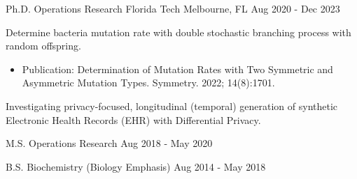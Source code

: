 \vspace{-4mm}
\vspace{-2mm}

\begin{cventries}

	\cventry
	{Ph.D. Operations Research}
	{Florida Tech}
	{Melbourne, FL}
	{Aug 2020 - Dec 2023}
	{\begin{cvitems}
			\item {Determine bacteria mutation rate with double stochastic branching process with random offspring.
			            \begin{itemize}
				            \item {Publication: Determination of Mutation Rates with Two Symmetric and Asymmetric Mutation Types. Symmetry. 2022; 14(8):1701.}
			            \end{itemize}}
			\item {Investigating privacy-focused, longitudinal (temporal) generation of synthetic Electronic Health Records (EHR) with Differential Privacy.}
		\end{cvitems}}

	\vspace{-2mm}

	\cventry
	{M.S. Operations Research}
	{}
	{}
	{Aug 2018 - May 2020}
	{}
	\vspace{-7mm}

	\cventry
	{B.S. Biochemistry (Biology Emphasis)}
	{}
	{}
	{Aug 2014 - May 2018}
	{}
	\vspace{-7mm}

\end{cventries}